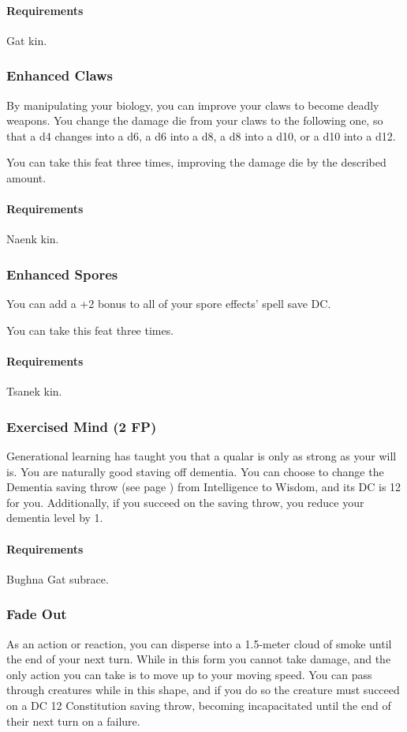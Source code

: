     \paragraph{Requirements} Gat kin.
\subsubsection{Enhanced Claws} \label{feat::enhancedclaws}
    By manipulating your biology, you can improve your claws to become deadly weapons.
    You change the damage die from your claws to the following one, so that a d4 changes into a d6, a d6 into a d8, a d8 into a d10, or a d10 into a d12.

    You can take this feat three times, improving the damage die by the described amount.
    \paragraph{Requirements} Naenk kin.
\subsubsection{Enhanced Spores} \label{feat::enhancedspores}
    You can add a +2 bonus to all of your spore effects' spell save DC.

    You can take this feat three times.
    \paragraph{Requirements} Tsanek kin.
\subsubsection{Exercised Mind (2 FP)} \label{feat::exercisedmind}
    Generational learning has taught you that a qualar is only as strong as your will is.
    You are naturally good staving off dementia.
    You can choose to change the Dementia saving throw (see page \pageref{ssec::dementia}) from Intelligence to Wisdom, and its DC is 12 for you.
    Additionally, if you succeed on the saving throw, you reduce your dementia level by 1.
    \paragraph{Requirements} Bughna Gat subrace.
\subsubsection{Fade Out} \label{feat::fadeout}
    As an action or reaction, you can disperse into a 1.5-meter cloud of smoke until the end of your next turn.
    While in this form you cannot take damage, and the only action you can take is to move up to your moving speed.
    You can pass through creatures while in this shape, and if you do so the creature must succeed on a DC 12 Constitution saving throw, becoming incapacitated until the end of their next turn on a failure.

